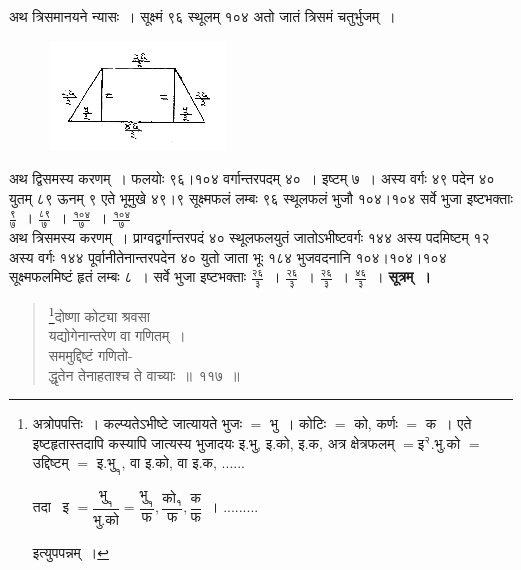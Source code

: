 \documentclass[11pt, openany]{book}
\begin{document}
 अथ त्रिसमानयने न्यासः~। सूक्ष्मं ९६ स्थूलम् १०४ अतो जातं त्रिसमं
चतुर्भुजम्~। 
\vspace{-2mm}

\begin{figure}[h!]
     \centering
     \includegraphics[scale=0.85]{graphics/capture141.png}
\end{figure} 
\vspace{-2mm}

 अथ द्विसमस्य करणम्~। फलयोः ९६।१०४ वर्गान्तरपदम् ४०~। इष्टम् ७~। अस्य वर्गः ४९ पदेन ४० युतम् ८९ ऊनम् ९ एते भूमुखे ४९।९ सूक्ष्मफलं लम्बः ९६ स्थूलफलं भुजौ १०४।१०४ सर्वे भुजा इष्टभक्ताः $\frac{\mbox{९}}{\mbox{७}}$~। $\frac{\mbox{८९}}{\mbox{७}}$~। $\frac{\mbox{१०४}}{\mbox{७}}$~। $\frac{\mbox{१०४}}{\mbox{७}}$\\

\vspace{-2mm}
 अथ त्रिसमस्य करणम्~। प्राग्वद्वर्गान्तरपदं ४० स्थूलफलयुतं
जातोऽभीष्टवर्गः १४४ अस्य पदमिष्टम् १२ अस्य वर्गः १४४
पूर्वानीतेनान्तरपदेन ४० युतो जाता भूः १८४ भुजवदनानि १०४।१०४।१०४
सूक्ष्मफलमिष्टं हृतं लम्बः ८~। सर्वे भुजा इष्टभक्ताः $\frac{\mbox{२६}}{\mbox{३}}$~। $\frac{\mbox{२६}}{\mbox{३}}$~। $\frac{\mbox{२६}}{\mbox{३}}$~। $\frac{\mbox{४६}}{\mbox{३}}$~। 
\newpage
 \textbf{सूत्रम्~।} 
\begin{quote}
    \bs 
    \footnote{अत्रोपपत्तिः~। कल्प्यतेऽभीष्टे जात्यायते भुजः $=$ भु~। कोटिः $=$ को, कर्णः $=$ क~। एते इष्टहृतास्तदापि कस्यापि जात्यस्य भुजादयः इ.भु, इ.को, इ.क, अत्र क्षेत्रफलम् $= \mbox{इ}^{\text{२}}$.भु.को $=$ उद्दिष्टम् $=$ इ.$\mbox{भु}_{\text{१}}$,\; वा\; इ.को,\; वा\; इ.क, ...... 
\vspace{2mm}

\hspace{6mm} तदा~ इ $= \dfrac{\mbox{भु}_{\text{१}}}{\mbox{भु.को}} = \dfrac{\mbox{भु}_{\text{१}}}{\mbox{फ}}, \dfrac{\mbox{को}_{\text{१}}}{\mbox{फ}}, \dfrac{\mbox{क}}{\mbox{फ}}$~। ......... 
\vspace{2mm}

\hspace{2mm} इत्युपपन्नम्~।}दोष्णा कोट्या श्रवसा \\
यद्योगेनान्तरेण वा गणितम्~। \\
सममुद्दिष्टं गणितो-\\
द्धृतेन तेनाहताश्च ते वाच्याः~॥~११७~॥~
\end{quote}
\end{document}
